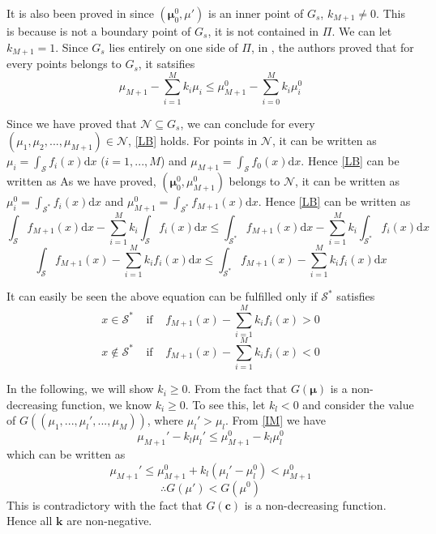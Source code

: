 \documentclass[12pt,journal,a4paper,twoside,onecolumn]{IEEEtran}
\begin{document}
\begin{spacing}{2.5}
It is also been proved in \cite{dantzig1951fundamental, LehmannTest} since $(\boldsymbol{\mu}_0^0, \mu')$ is an inner point of $G_s$, $k_{M+1} \neq 0$. This is because is not a boundary point of $G_s$, it is not contained in $\Pi$.  We can let $k_{M+1} = 1$. Since $G_s$ lies entirely on one side of $\Pi$, in \cite{dantzig1951fundamental, LehmannTest}, the authors proved that for every points belongs to $G_s$, it satsifies
\begin{equation}
\label{LB}
\mu_{M+1} - \sum_{i=1}^{M}k_i\mu_i \leq \mu_{M+1}^0 - \sum_{i=0}^{M}k_i\mu_i^0
\end{equation}

Since we have proved that $\mathcal{N} \subseteq G_s$, we can conclude for every $(\mu_1, \mu_2, ..., \mu_{M+1}) \in \mathcal{N}$, \eqref{LB} holds. 
For points in $\mathcal{N}$, it can be written as $\mu_i = \int_{\mathcal{S}} f_i(x)\mathrm{d}x$ ($i=1, ..., M$) and $\mu_{M+1} = \int_{\mathcal{S}} f_0(x)\mathrm{d}x$. Hence \eqref{LB} can be written as
As we have proved, $(\boldsymbol{\mu}^0_0, \mu^0_{M+1})$ belongs to $\mathcal{N}$, it can be written as $\mu_i^0 = \int_{\mathcal{S}^\ast}f_i(x)\mathrm{d}x$ and  $\mu_{M+1}^0 = \int_{\mathcal{S}^\ast}f_{M+1}(x)\mathrm{d}x$. 
Hence \eqref{LB} can be written as
\[
\int_{\mathcal{S}}f_{M+1}(x)\mathrm{d}x - \sum_{i=1}^{M}k_i\int_{\mathcal{S}}f_{i}(x)\mathrm{d}x \leq \int_{\mathcal{S}^\ast}f_{M+1}(x)\mathrm{d}x - \sum_{i=1}^{M}k_i\int_{\mathcal{S}^\ast}f_{i}(x)\mathrm{d}x 
\]
\[
\int_{\mathcal{S}}f_{M+1}(x)- \sum_{i=1}^{M}k_if_{i}(x)\mathrm{d}x \leq \int_{\mathcal{S}^\ast}f_{M+1}(x)- \sum_{i=1}^{M}k_if_{i}(x)\mathrm{d}x 
\]

It can easily be seen the above equation can be fulfilled only if $\mathcal{S}^\ast$ satisfies
\[
x \in \mathcal{S}^\ast\;\;\;\;\text{if}\;\;\;\;f_{M+1}(x)- \sum_{i=1}^{M}k_if_{i}(x) > 0
\]
\[
x \notin \mathcal{S}^\ast\;\;\;\;\text{if}\;\;\;\;f_{M+1}(x)- \sum_{i=1}^{M}k_if_{i}(x) < 0
\]

In the following, we will show $k_i \geq 0$. 
From the fact that $G(\mathbf{\mu})$ is a non-decreasing function, we know $k_i \geq 0$. To see this, let $k_l < 0$ and consider the value of $G((\mu_1,..., \mu_l', ..., \mu_M))$, where $\mu_l' > \mu_l$.  From \eqref{IM} we have 
\[
\mu_{M+1}' - k_l\mu_l' \leq \mu_{M+1}^0 - k_l\mu_l^0
\]
which can be written as
\[
\mu_{M+1}' \leq \mu_{M+1}^0 + k_l(\mu_l' - \mu_l^0) < \mu_{M+1}^0
\]
\[
\therefore G(\mu') < G(\mu^0)
\]
This is contradictory with the fact that $G(\mathbf{c})$ is a non-decreasing function. Hence all $\mathbf{k}$ are non-negative.


\end{spacing}
\end{document}
